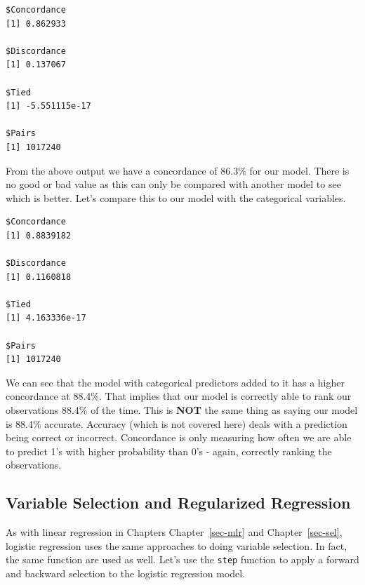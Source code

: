\documentclass[
  letterpaper,
  DIV=11,
  numbers=noendperiod]{scrreprt}
\newenvironment{Shaded}{\begin{snugshade}}{\end{snugshade}}
\newcommand{\AttributeTok}[1]{\textcolor[rgb]{0.40,0.45,0.13}{#1}}
\newcommand{\FunctionTok}[1]{\textcolor[rgb]{0.28,0.35,0.67}{#1}}
\newcommand{\NormalTok}[1]{\textcolor[rgb]{0.00,0.23,0.31}{#1}}
\newcommand{\SpecialCharTok}[1]{\textcolor[rgb]{0.37,0.37,0.37}{#1}}
\newcommand{\StringTok}[1]{\textcolor[rgb]{0.13,0.47,0.30}{#1}}
\begin{document}
\begin{verbatim}
$Concordance
[1] 0.862933

$Discordance
[1] 0.137067

$Tied
[1] -5.551115e-17

$Pairs
[1] 1017240
\end{verbatim}

From the above output we have a concordance of 86.3\% for our model.
There is no good or bad value as this can only be compared with another
model to see which is better. Let's compare this to our model with the
categorical variables.

\begin{Shaded}
\end{Shaded}

\begin{verbatim}
$Concordance
[1] 0.8839182

$Discordance
[1] 0.1160818

$Tied
[1] 4.163336e-17

$Pairs
[1] 1017240
\end{verbatim}

We can see that the model with categorical predictors added to it has a
higher concordance at 88.4\%. That implies that our model is correctly
able to rank our observations 88.4\% of the time. This is \textbf{NOT}
the same thing as saying our model is 88.4\% accurate. Accuracy (which
is not covered here) deals with a prediction being correct or incorrect.
Concordance is only measuring how often we are able to predict 1's with
higher probability than 0's - again, correctly ranking the observations.

\hypertarget{variable-selection-and-regularized-regression}{%
\subsection{Variable Selection and Regularized
Regression}\label{variable-selection-and-regularized-regression}}

As with linear regression in Chapters Chapter~\ref{sec-mlr} and
Chapter~\ref{sec-sel}, logistic regression uses the same approaches to
doing variable selection. In fact, the same function are used as well.
Let's use the \texttt{step} function to apply a forward and backward
selection to the logistic regression model.
\end{document}

